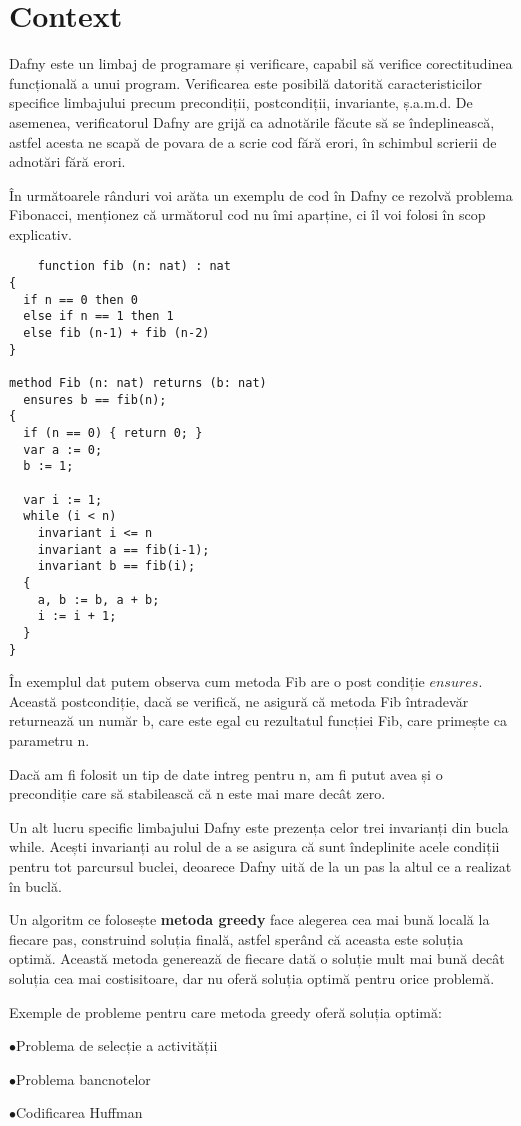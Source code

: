


\chapter{Context} 

Dafny este un limbaj de programare și verificare, capabil să verifice corectitudinea
funcțională a unui program. Verificarea este posibilă datorită caracteristicilor specifice limbajului precum precondiții, postcondiții, 
invariante, ș.a.m.d. De asemenea, verificatorul Dafny are grijă ca adnotările făcute să se îndeplinească,
astfel acesta ne scapă de povara de a scrie cod fără erori, în schimbul scrierii de adnotări fără erori.\cite{leino2010dafny}\par
În următoarele rânduri voi arăta un exemplu de cod în Dafny ce rezolvă problema Fibonacci, menționez că următorul cod
nu îmi aparține, ci îl voi folosi în scop explicativ. \cite{dafny:1}

\begin{lstlisting}
    function fib (n: nat) : nat
{
  if n == 0 then 0
  else if n == 1 then 1
  else fib (n-1) + fib (n-2)
}

method Fib (n: nat) returns (b: nat)
  ensures b == fib(n);
{
  if (n == 0) { return 0; }
  var a := 0;
  b := 1;
  
  var i := 1;
  while (i < n)
    invariant i <= n
    invariant a == fib(i-1);
    invariant b == fib(i);
  {
    a, b := b, a + b;
    i := i + 1;
  }
}
\end{lstlisting}

În exemplul dat putem observa cum metoda Fib are o post condiție $ensures$. Această postcondiție, dacă se verifică,
ne asigură că metoda Fib întradevăr returnează un număr b, care este egal cu rezultatul funcției Fib, care primește ca parametru n.\par
Dacă am fi folosit un tip de date intreg pentru n, am fi putut avea și o precondiție care să stabilească că n este mai mare decât zero.\par
Un alt lucru specific limbajului Dafny este prezența celor trei invarianți din bucla while.
Acești invarianți au rolul de a se asigura că sunt îndeplinite acele condiții pentru tot parcursul buclei, deoarece Dafny uită 
de la un pas la altul ce a realizat în buclă.\par

Un algoritm ce folosește \textbf{metoda greedy} face alegerea cea mai bună locală la fiecare pas, 
construind soluția finală, astfel sperând că aceasta este soluția optimă. Această metoda generează de fiecare dată 
o soluție mult mai bună decât soluția cea mai costisitoare, dar nu oferă soluția optimă pentru orice problemă.\par
Exemple de probleme pentru care metoda greedy oferă soluția optimă: \par
$\bullet$Problema de selecție a activității\par
$\bullet$Problema bancnotelor\par
$\bullet$Codificarea Huffman\par
 
